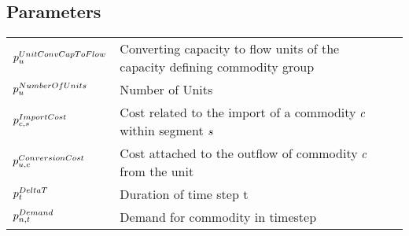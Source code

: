 \subsection*{Parameters}
\vspace{-1em}
	\begin{longtable}{p{\cola} p{\colc} >{\small\raggedleft\arraybackslash\itshape}p{\colb}}

		$p^{UnitConvCapToFlow}_{u}$	& Converting capacity to flow units of the capacity defining commodity group	&                \\
		$p^{NumberOfUnits}_{u}$	& Number of Units                                             	&                \\[0.5em]

		$p^{ImportCost}_{c,s}   $	& Cost related to the import of a commodity $c$ within segment $s$ 	&                \\[0.5em]

		$p^{ConversionCost}_{u,c}$	& Cost attached to the outflow of commodity $c$ from the unit	&                \\[0.5em]

		$p^{DeltaT}_{t}       $	& Duration of time step t                                     	&                \\[0.5em]

		$p^{Demand}_{n,t}       $	& Demand for commodity \commodity in timestep \timestep       	&                \\[0.5em]


\end{longtable}
